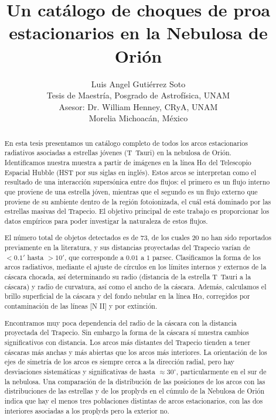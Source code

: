 \documentclass{report}
\title{Un catálogo de choques de proa estacionarios en la Nebulosa de Orión}
\author{
  Luis Angel Gutiérrez Soto\\
  Tesis de Maestría, Posgrado de Astrofísica, UNAM\\
  Asesor: Dr. William Henney, CRyA, UNAM\\
  Morelia Michoacán, México
  }
\newcommand\ha{\ensuremath{\mathrm{H}\alpha}}
\begin{document}
\maketitle

\tableofcontents

\begin{abstract}
  En esta tesis presentamos un catálogo completo de todos los arcos
  estacionarios radiativos asociadas a estrellas jóvenes (T~Tauri) en
  la nebulosa de Orión.  Identificamos nuestra muestra a partir de
  imágenes en la línea H$\alpha$ del Telescopio Espacial Hubble (HST
  por sus siglas en inglés). Estos arcos se interpretan como el
  resultado de una interacción supersónica entre dos flujos: el
  primero es un flujo interno que proviene de una estrella jóven,
  mientras que el segundo es un flujo externo que proviene de su
  ambiente dentro de la región fotoionizada, el cuál está dominado por
  las estrellas masivas del Trapecio.  El objetivo principal de este
  trabajo es proporcionar los datos empíricos para poder investigar la
  naturaleza de estos flujos.

  El número total de objetos detectados es de 73, de los cuales 20 no
  han sido reportados previamente en la literatura, y sus distancias
  proyectadas del Trapecio varían de $< 0.1'$ hasta $> 10'$, que
  corresponde a $0.01$ a $1$ parsec. Clasificamos la forma de los
  arcos radiativos, mediante el ajuste de círculos en los límites
  internos y externos de la cáscara chocada, así determinando su radio
  (distancia de la estrella T~Tauri a la cáscara) y radio de curvatura, así como
  el ancho de la cáscara.  Además, calculamos el brillo superficial de
  la cáscara y del fondo nebular en la línea \ha{}, corregidos por
  contaminación de las líneas [N II] y por extinción. 

  Encontramos muy poca dependencia del radio de la cáscara con la
  distancia proyectada del Trapecio.  Sin embargo la forma de la
  cáscara sí muestra cambios significativos con distancia.  Los arcos
  más distantes del Trapecio tienden a tener cáscaras más anchas y más
  abiertas que los arcos más interiores.  La orientación de los ejes
  de simetría de los arcos es siempre cerca a la dirección radial,
  pero hay desviaciones sistemáticas y significativas de hasta
  $\approx 30^\circ$,
  particularmente en el sur de la nebulosa.  Una comparación de la
  distribución de las posiciones de los arcos con las distribuciones
  de las estrellas y de los proplyds en el cúmulo de la Nebulosa de
  Orión indica que hay el menos tres poblaciones distintas de arcos
  estacionarios, con las dos interiores asociadas a los
  proplyds pero la exterior no. 


\end{abstract}
\end{document}
